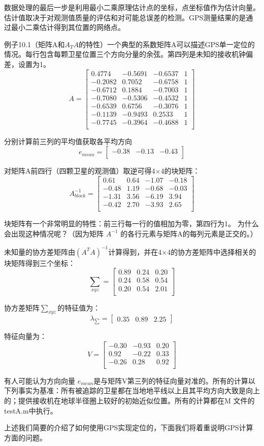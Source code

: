 数据处理的最后一步是利用最小二乘原理估计点的坐标，点坐标值作为估计向量。估计值取决于对观测值质量的评估和对可能总误差的检测。GPS测量结果的是通过最小二乘估计得到其位置的网络点。

例子10.1（矩阵A和$A_{T}A$的特性）一个典型的系数矩阵A可以描述GPS单一定位的情况。每行包含每颗卫星位置三个方向分量的余弦。第四列是未知的接收机钟偏差，设置为1。
$$
A=\begin{bmatrix}
0.4774 & -0.5691 & -0.6537 & 1\\
-0.2082 & 0.7052 & -0.6758 & 1\\
-0.6712 & 0.1884 & -0.7003 & 1\\
-0.7080 & -0.5306 & -0.4532 & 1\\
-0.6539 & 0.6756 & -0.3076 & 1\\
-0.1139 & -0.9493 & 0.2533 & 1\\
-0.7745 & -0.3964 & -0.4688 & 1\\
\end{bmatrix}
$$

分别计算前三列的平均值获取各平均方向
$$
e_{mean}=\begin{bmatrix}
-0.38 & -0.13 & -0.43\\
\end{bmatrix}
$$

对矩阵A前四行（四颗卫星的观测值）取逆可得4×4的块矩阵：
$$
A_{block}^{-1}=\begin{bmatrix}
0.61 & 0.64 & -1.07 & -0.18\\
-0.48 & 1.19 & -0.68 & -0.03\\
-1.31 & 3.56 & -6.19 & 3.94\\
-0.42 & 2.70 & -3.93 & 2.65\\
\end{bmatrix}
$$

块矩阵有一个非常明显的特性：前三行每一行的值相加为零，第四行为1。 为什么会出现这种情况呢？（因为矩阵 $A^{-1}$ 的各行元素与矩阵A的每列元素是正交的。）

未知量的协方差矩阵由$(A^{T}A)^{-1}$计算得到，并在4×4的协方差矩阵中选择相关的块矩阵得到三个坐标：
$$
\sum_{xyz}=\begin{bmatrix}
0.89& 0.24& 0.20\\
0.24& 0.58& 0.54\\
0.20& 0.54& 2.01\\
\end{bmatrix}
$$

协方差矩阵$\sum_{xyz}$的特征值为：
$$
\lambda_{\sum}=\begin{bmatrix}
0.35& 0.89& 2.25
\end{bmatrix}
$$

特征向量为：
$$
V=\begin{bmatrix}
-0.30& -0.93& 0.20\\
0.92 &-0.22& 0.33\\
-0.26& 0.28& 0.92\\
\end{bmatrix}
$$

有人可能认为方向向量 $e_{mean}$是与矩阵V第三列的特征向量对准的。所有的计算以下列事实为基准：所有被追踪的卫星都在当地地平线以上且其平均方向大致是向上的；提供接收机在地球半径圈上较好的初始近似位置。所有的计算都在M 文件的testA.m中执行。

上述我们简要的介绍了如何使用GPS实现定位的，下面我们将着重说明GPS计算方面的问题。